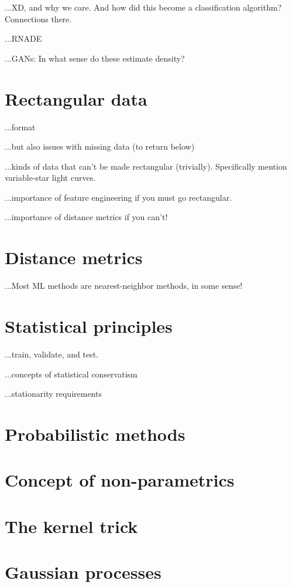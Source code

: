 \documentclass[12pt, twoside, letterpaper]{article}
\begin{document}
...XD, and why we care. And how did this become a classification algorithm? Connections there.

...RNADE

...GANs: In what sense do these estimate density?

\section{Rectangular data}

...format

...but also issues with missing data (to return below)

...kinds of data that can't be made rectangular (trivially). Specifically mention variable-star light curves.

...importance of feature engineering if you must go rectangular.

...importance of distance metrics if you can't!

\section{Distance metrics}

...Most ML methods are nearest-neighbor methods, in some sense!

\section{Statistical principles}

...train, validate, and test.

...concepts of statistical conservatism

...stationarity requirements

\section{Probabilistic methods}

\section{Concept of non-parametrics}

\section{The kernel trick}

\section{Gaussian processes}
\end{document}
